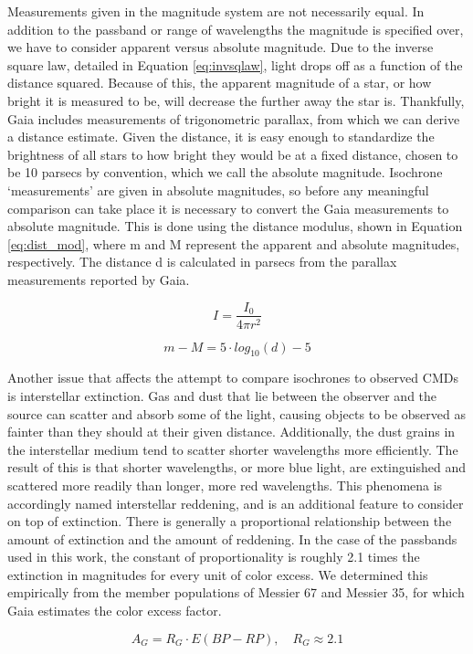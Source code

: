 \documentclass[onecolumn,table,xcdraw,super]{aastex631}
\newcommand{\beq}{\begin{equation}}
\newcommand{\eeq}{\end{equation}}
\begin{document}
Measurements given in the magnitude system are not necessarily equal. In addition to the passband or range of wavelengths the magnitude is specified over, we have to consider apparent versus absolute magnitude. Due to the inverse square law, detailed in Equation \ref{eq:invsqlaw}, light drops off as a function of the distance squared. Because of this, the apparent magnitude of a star, or how bright it is measured to be, will decrease the further away the star is. Thankfully, Gaia includes measurements of trigonometric parallax, from which we can derive a distance estimate. Given the distance, it is easy enough to standardize the brightness of all stars to how bright they would be at a fixed distance, chosen to be 10 parsecs by convention, which we call the absolute magnitude. Isochrone `measurements' are given in absolute magnitudes, so before any meaningful comparison can take place it is necessary to convert the Gaia measurements to absolute magnitude. This is done using the distance modulus, shown in Equation \ref{eq:dist_mod}, where m and M represent the apparent and absolute magnitudes, respectively. The distance d is calculated in parsecs from the parallax measurements reported by Gaia.

\beq
\label{eq:invsqlaw}
I = \frac{I_0}{4\pi r^2}
\eeq

\beq
\label{eq:dist_mod}
m - M  = 5\cdot log_{10}\left(d\right) - 5
\eeq

Another issue that affects the attempt to compare isochrones to observed CMDs is interstellar extinction. Gas and dust that lie between the observer and the source can scatter and absorb some of the light, causing objects to be observed as fainter than they should at their given distance. Additionally, the dust grains in the interstellar medium tend to scatter shorter wavelengths more efficiently. The result of this is that shorter wavelengths, or more blue light, are extinguished and scattered more readily than longer, more red wavelengths. This phenomena is accordingly named interstellar reddening, and is an additional feature to consider on top of extinction. There is generally a proportional relationship between the amount of extinction and the amount of reddening. In the case of the passbands used in this work, the constant of proportionality is roughly 2.1 times the extinction in magnitudes for every unit of color excess. We determined this empirically from the member populations of Messier 67 and Messier 35, for which Gaia estimates the color excess factor.

\beq
\label{eq:extinction}
A_G = R_G \cdot E\left(BP-RP\right), \quad R_G \approx 2.1
\eeq
\end{document}
